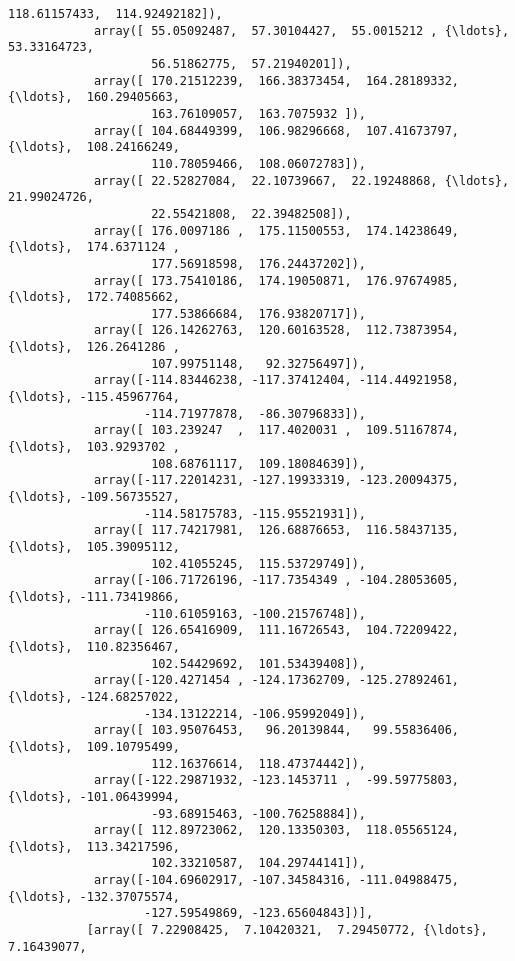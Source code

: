 \documentclass[11pt]{article}
\begin{document}
\begin{Verbatim}[commandchars=\\\{\}]
                    118.61157433,  114.92492182]),
            array([ 55.05092487,  57.30104427,  55.0015212 , {\ldots},  53.33164723,
                    56.51862775,  57.21940201]),
            array([ 170.21512239,  166.38373454,  164.28189332, {\ldots},  160.29405663,
                    163.76109057,  163.7075932 ]),
            array([ 104.68449399,  106.98296668,  107.41673797, {\ldots},  108.24166249,
                    110.78059466,  108.06072783]),
            array([ 22.52827084,  22.10739667,  22.19248868, {\ldots},  21.99024726,
                    22.55421808,  22.39482508]),
            array([ 176.0097186 ,  175.11500553,  174.14238649, {\ldots},  174.6371124 ,
                    177.56918598,  176.24437202]),
            array([ 173.75410186,  174.19050871,  176.97674985, {\ldots},  172.74085662,
                    177.53866684,  176.93820717]),
            array([ 126.14262763,  120.60163528,  112.73873954, {\ldots},  126.2641286 ,
                    107.99751148,   92.32756497]),
            array([-114.83446238, -117.37412404, -114.44921958, {\ldots}, -115.45967764,
                   -114.71977878,  -86.30796833]),
            array([ 103.239247  ,  117.4020031 ,  109.51167874, {\ldots},  103.9293702 ,
                    108.68761117,  109.18084639]),
            array([-117.22014231, -127.19933319, -123.20094375, {\ldots}, -109.56735527,
                   -114.58175783, -115.95521931]),
            array([ 117.74217981,  126.68876653,  116.58437135, {\ldots},  105.39095112,
                    102.41055245,  115.53729749]),
            array([-106.71726196, -117.7354349 , -104.28053605, {\ldots}, -111.73419866,
                   -110.61059163, -100.21576748]),
            array([ 126.65416909,  111.16726543,  104.72209422, {\ldots},  110.82356467,
                    102.54429692,  101.53439408]),
            array([-120.4271454 , -124.17362709, -125.27892461, {\ldots}, -124.68257022,
                   -134.13122214, -106.95992049]),
            array([ 103.95076453,   96.20139844,   99.55836406, {\ldots},  109.10795499,
                    112.16376614,  118.47374442]),
            array([-122.29871932, -123.1453711 ,  -99.59775803, {\ldots}, -101.06439994,
                    -93.68915463, -100.76258884]),
            array([ 112.89723062,  120.13350303,  118.05565124, {\ldots},  113.34217596,
                    102.33210587,  104.29744141]),
            array([-104.69602917, -107.34584316, -111.04988475, {\ldots}, -132.37075574,
                   -127.59549869, -123.65604843])],
           [array([ 7.22908425,  7.10420321,  7.29450772, {\ldots},  7.16439077,

\end{Verbatim}
\end{document}
